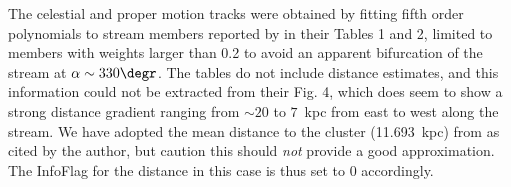 The celestial and proper motion tracks were obtained by fitting fifth order polynomials to stream members reported by \citet{Grillmair2022} in their Tables 1 and 2, limited to members with weights larger than 0.2 to avoid an apparent bifurcation of the stream at $\alpha\sim 330\degr$. The tables do not include distance estimates, and this information could not be extracted from their Fig. 4, which does seem to show a strong distance gradient ranging from $\sim20$ to $7$~kpc from east to west along the stream. We have adopted the mean distance to the cluster (11.693~kpc) from \citet{Baumgardt2021} as cited by the author, but caution this should \emph{not} provide a good approximation. The InfoFlag for the distance in this case is thus set to 0 accordingly.
